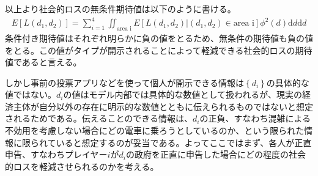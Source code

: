 \documentclass{jsarticle}
\begin{document}
以上より社会的ロスの無条件期待値は以下のように書ける。
\begin{align*}
	E[L(d_1, d_2)] = \sum_{i = 1}^4 \iint_{\text{area i}} E[L(d_1, d_2) | (d_1, d_2) \in \text{area i}] \phi^2(d) \mathrm{d}d \mathrm{d}d
\end{align*}
条件付き期待値はそれぞれ明らかに負の値をとるため、無条件の期待値も負の値をとる。この値がタイプが開示されることによって軽減できる社会的ロスの期待値であると言える。

しかし事前の投票アプリなどを使って個人が開示できる情報は$\left\{ d_i\right\}$の具体的な値ではない。$d_i$の値はモデル内部では具体的な数値として扱われるが、現実の経済主体が自分以外の存在に明示的な数値とともに伝えられるものではないと想定されるためである。伝えることのできる情報は、$d_i$の正負、すなわち混雑による不効用を考慮しない場合にどの電車に乗ろうとしているのか、という限られた情報に限られていると想定するのが妥当である。よってここではまず、各人が正直申告、すなわちプレイヤー$i$が$d_i$の政府を正直に申告した場合にどの程度の社会的ロスを軽減させられるのかを考える。
\end{document}
